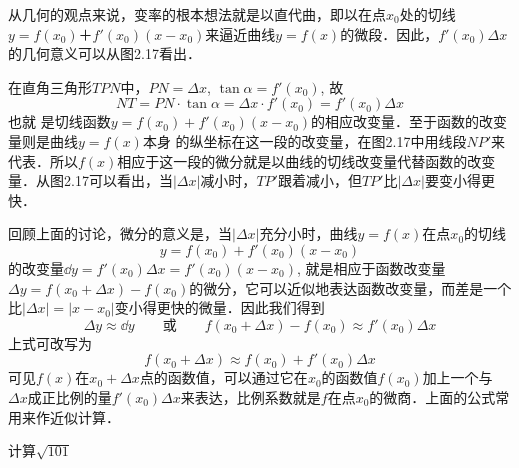 从几何的观点来说，变率的根本想法就是以直代曲，即以在点$x_0$处的切线$y=f(x_0)＋f'(x_0)(x-x_0)$来逼近曲线$y=f(x)$的微段．因此，$f'(x_0)\Delta x$的几何意义可以从图2.17看出．

\begin{figure}[htp]
    \centering
    \caption{}
\end{figure}

在直角三角形$TPN$中，$PN=\Delta x$, $\tan\alpha=f'(x_0)$, 故
\[NT=PN\cdot \tan\alpha=\Delta x\cdot f'(x_0)=f'(x_0)\Delta x\]
也就
是切线函数$y=f (x_0) +f' (x_0) (x-x_0)$的相应改变量．至于函数的改变量则是曲线$y=f(x)$本身
的纵坐标在这一段的改变量，在图2.17中用线段$NP'$来代表．所以$f(x)$相应于这一段的微分就是以曲线的切线改变量代替函数的改变量．从图2.17可以看出，当$|\Delta x|$减小时，$TP'$跟着减小，但$TP'$比$|\Delta x|$要变小得更快．

回顾上面的讨论，微分的意义是，当$|\Delta x|$充分小时，曲线$y=f(x)$在点$x_0$的切线
\[y=f (x_0) +f' (x_0) (x-x_0)\]
的改变量$\dd y=f'(x_0)\Delta x=f'(x_0)(x-x_0)$, 就是相应于函数改变量$\Delta y=f(x_0+\Delta x)-f(x_0)$的微分，它可以近似地表达函数改变量，而差是一个比$|\Delta x|=|x-x_0|$变小得更快的微量．因此我们得到
\[\Delta y\approx \dd y\qquad \text{或}\qquad f(x_0+\Delta x)-f(x_0)\approx f'(x_0)\Delta x\]
上式可改写为
\[f (x_0+\Delta x) \approx f (x_0) +f' (x_0) \Delta x\]
可见$f(x)$在$x_0+\Delta x$点的函数值，可以通过它在$x_0$的函数值$f(x_0)$加上一个与$\Delta x$成正比例的量$f'(x_0)\Delta x$来表达，比例系数就是$f$在点$x_0$的微商．上面的公式常用来作近似计算．

\begin{example}
    计算$\sqrt{101}$
\end{example}


